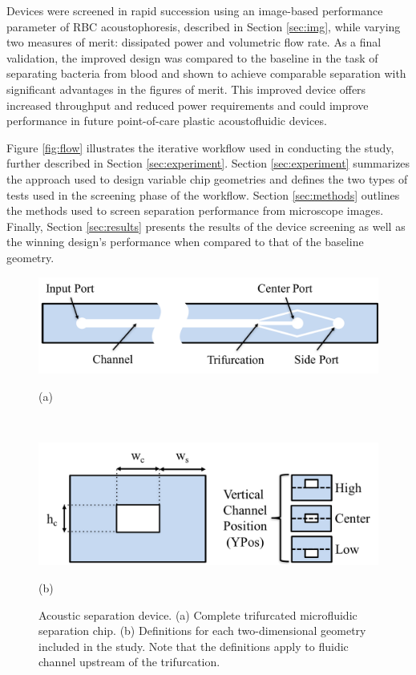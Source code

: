 Devices were screened in rapid succession using an image-based performance parameter of RBC acoustophoresis,  described in Section \ref{sec:img}, while varying two measures of merit: dissipated power and volumetric flow rate. As a final validation, the improved design was compared to the baseline in the task of separating bacteria from blood and shown to achieve comparable separation with significant advantages in the figures of merit. This improved device offers increased throughput and reduced power requirements and could improve performance in future point-of-care plastic acoustofluidic devices.

Figure \ref{fig:flow} illustrates the iterative workflow used in conducting the study, further described in Section \ref{sec:experiment}. Section \ref{sec:experiment} summarizes the approach used to design variable chip geometries and defines the two types of tests used in the screening phase of the workflow. Section \ref{sec:methods} outlines the methods used to screen separation performance from microscope images. Finally, Section \ref{sec:results} presents the results of the device screening as well as the winning design's performance when compared to that of the baseline geometry. 

\begin{figure}[htb]
  \begin{minipage}[t]{0.99\linewidth}\centering
    \includegraphics[width=14cm]{chip}
    \medskip
    \centerline{(a)}
  \end{minipage}\hfill\\
  \begin{minipage}[t]{0.99\linewidth}\centering
    \includegraphics[width=14cm]{2D}
    \medskip
    \centerline{(b)}
  \end{minipage}
  \caption[Acoustofluidic separation device and 2D geometric definitions]{Acoustic separation device. (a) Complete trifurcated microfluidic separation chip. (b) Definitions for each two-dimensional geometry included in the study. Note that the definitions apply to fluidic channel upstream of the trifurcation.} 
  \label{fig:geometry}
\end{figure}


